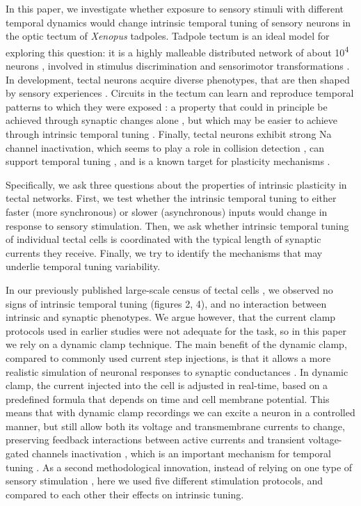 \documentclass{article}
\begin{document}
In this paper, we investigate whether exposure to sensory stimuli with different temporal dynamics would change intrinsic temporal tuning of sensory neurons in the optic tectum of \textit{Xenopus} tadpoles. Tadpole tectum is an ideal model for exploring this question: it is a highly malleable distributed network of about 10\textsuperscript{4} neurons \citep{pratt2013}, involved in stimulus discrimination and sensorimotor transformations \citep{dong2009,khakhalin2014}. In development, tectal neurons acquire diverse phenotypes, that are then shaped by sensory experiences \citep{xu2011,ciarleglio2015}. Circuits in the tectum can learn and reproduce temporal patterns to which they were exposed \citep{pratt2008}: a property that could in principle be achieved through synaptic changes alone \citep{lukovsevivcius2009}, but which may be easier to achieve through intrinsic temporal tuning \citep{narayanan2008,beatty2014}. Finally, tectal neurons exhibit strong Na channel inactivation, which seems to play a role in collision detection \citep{jang2016}, can support temporal tuning \citep{clay2012optimal,fontaine2014threshold,zbili2019axonnav}, and is a known target for plasticity mechanisms \citep{bianchi2012}.

Specifically, we ask three questions about the properties of intrinsic plasticity in tectal networks. First, we test whether the intrinsic temporal tuning to either faster (more synchronous) or slower (asynchronous) inputs would change in response to sensory stimulation. Then, we ask whether intrinsic temporal tuning of individual tectal cells is coordinated with the typical length of synaptic currents they receive. Finally, we try to identify the mechanisms that may underlie temporal tuning variability. 

In our previously published large-scale census of tectal cells \citep{ciarleglio2015}, we observed no signs of intrinsic temporal tuning (figures 2, 4), and no interaction between intrinsic and synaptic phenotypes. We argue however, that the current clamp protocols used in earlier studies were not adequate for the task, so in this paper we rely on a dynamic clamp technique. The main benefit of the dynamic clamp, compared to commonly used current step injections, is that it allows a more realistic simulation of neuronal responses to synaptic conductances \citep{prinz2004}. In dynamic clamp, the current injected into the cell is adjusted in real-time, based on a predefined formula that depends on time and cell membrane potential. This means that with dynamic clamp recordings we can excite a neuron in a controlled manner, but still allow both its voltage and transmembrane currents to change, preserving feedback interactions between active currents and transient voltage-gated channels inactivation \citep{ma1996dynamic,zbili2019axonnav}, which is an important mechanism for temporal tuning \citep{branco2010dendritic,platkiewicz2011}. As a second methodological innovation, instead of relying on one type of sensory stimulation \citep{ciarleglio2015}, here we used five different stimulation protocols, and compared to each other their effects on intrinsic tuning. 
\end{document}
